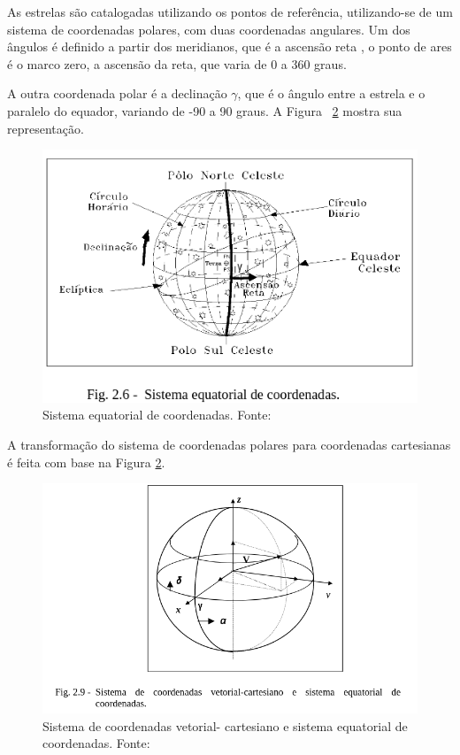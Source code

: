 As estrelas são catalogadas utilizando os pontos de referência, 
utilizando-se de um sistema de coordenadas polares, com duas coordenadas angulares. 
Um dos ângulos é definido a partir dos meridianos, que é a ascensão reta , o ponto de ares é o marco zero, 
a ascensão da reta, que varia de 0 a 360 graus.

A outra coordenada polar é a declinação $\gamma$, que é o ângulo entre a estrela e o paralelo do equador, 
variando de -90 a 90 graus. A Figura ~\ref{fig:Sistema_de_coordenadas_vetorial} mostra sua representação.

\begin{figure}[H]
	\centering
	\includegraphics[width=.7\columnwidth, trim={0 30 0 0}, clip]{images/Sistema_equatorial_de_coordenadas.png}
	\caption{Sistema equatorial de coordenadas. Fonte: ~\cite[]{Carvalho}}
	\label{fig:Sistema_equatorial_de_coordenadas}
\end{figure}

A transformação do sistema de coordenadas polares para coordenadas cartesianas é feita  com base na Figura \ref{fig:Sistema_de_coordenadas_vetorial}.

\begin{figure}[H]
	\centering
	\includegraphics[width=1\columnwidth, trim={0 60 0 0}, clip]{images/Sistema_de_coordenadas_vetorial.png}
	\caption{Sistema de coordenadas vetorial- cartesiano e sistema equatorial de coordenadas. Fonte: ~\cite[]{Carvalho}}
	\label{fig:Sistema_de_coordenadas_vetorial}
\end{figure}


